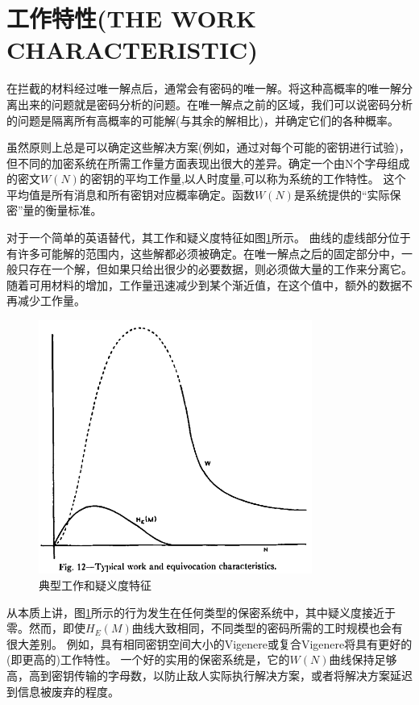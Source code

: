 \documentclass[]{article}
\begin{document}
\section{工作特性(THE WORK CHARACTERISTIC)}

在拦截的材料经过唯一解点后，通常会有密码的唯一解。将这种高概率的唯一解分离出来的问题就是密码分析的问题。在唯一解点之前的区域，我们可以说密码分析的问题是隔离所有高概率的可能解(与其余的解相比)，并确定它们的各种概率。

虽然原则上总是可以确定这些解决方案(例如，通过对每个可能的密钥进行试验)，但不同的加密系统在所需工作量方面表现出很大的差异。确定一个由N个字母组成的密文$W(N)$的密钥的平均工作量,以人时度量,可以称为系统的工作特性。
这个平均值是所有消息和所有密钥对应概率确定。函数$W(N)$是系统提供的“实际保密”量的衡量标准。

对于一个简单的英语替代，其工作和疑义度特征如图\ref{fig:fig12}所示。
曲线的虚线部分位于有许多可能解的范围内，这些解都必须被确定。在唯一解点之后的固定部分中，一般只存在一个解，但如果只给出很少的必要数据，则必须做大量的工作来分离它。随着可用材料的增加，工作量迅速减少到某个渐近值，在这个值中，额外的数据不再减少工作量。

\begin{figure}[htbp]
	\centering
	\includegraphics[width=0.8\textwidth]{fig12.png}
	\caption{典型工作和疑义度特征}
	\label{fig:fig12}
\end{figure}

从本质上讲，图\ref{fig:fig12}所示的行为发生在任何类型的保密系统中，其中疑义度接近于零。然而，即使$H_E(M)$曲线大致相同，不同类型的密码所需的工时规模也会有很大差别。
例如，具有相同密钥空间大小的Vigenere或复合Vigenere将具有更好的(即更高的)工作特性。
一个好的实用的保密系统是，它的$W(N)$曲线保持足够高，高到密钥传输的字母数，以防止敌人实际执行解决方案，或者将解决方案延迟到信息被废弃的程度。
\end{document}
